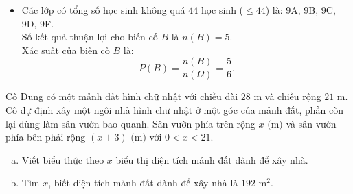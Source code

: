 \begin{bt}
{\begin{enumerate}[a)]
\begin{itemize}
        Số kết quả thuận lợi cho biến cố $A$ là $n(A) = 4$.\\
        Xác suất của biến cố $A$ là:
        $$P(A) = \dfrac{n(A)}{n(\Omega)} = \dfrac{4}{6} = \dfrac{2}{3}.$$
        \item Các lớp có tổng số học sinh không quá $44$ học sinh ($\le 44$) là: 9A, 9B, 9C, 9D, 9F.\\
        Số kết quả thuận lợi cho biến cố $B$ là $n(B) = 5$.\\
        Xác suất của biến cố $B$ là:
        $$P(B) = \dfrac{n(B)}{n(\Omega)} = \dfrac{5}{6}.$$
    \end{itemize}
\end{enumerate}
}
\end{bt}

\begin{bt}%
Cô Dung có một mảnh đất hình chữ nhật với chiều dài $28\text{ m}$ và chiều rộng $21\text{ m}$. Cô dự định xây một ngôi nhà hình chữ nhật ở một góc của mảnh đất, phần còn lại dùng làm sân vườn bao quanh. Sân vườn phía trên rộng $x\text{ (m)}$ và sân vườn phía bên phải rộng $(x + 3)\text{ (m)}$ với $0 < x < 21$.
\begin{enumerate}[a)]
    \item Viết biểu thức theo $x$ biểu thị diện tích mảnh đất dành để xây nhà.
    \item Tìm $x$, biết diện tích mảnh đất dành để xây nhà là $192\text{ m}^2$.
\end{enumerate}
\end{bt}

